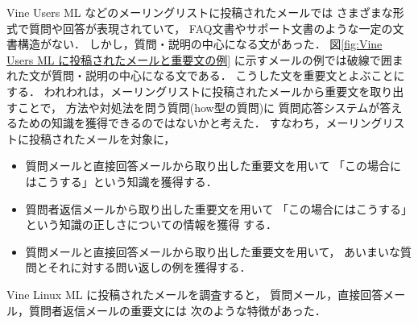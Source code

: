   Vine Users ML などのメーリングリストに投稿されたメールでは
  さまざまな形式で質問や回答が表現されていて，
  FAQ文書やサポート文書のような一定の文書構造がない．
  しかし，質問・説明の中心になる文があった．
  図\ref{fig:Vine Users ML に投稿されたメールと重要文の例}    
  に示すメールの例では破線で囲まれた文が質問・説明の中心になる文である．
  こうした文を重要文とよぶことにする．
  われわれは，メーリングリストに投稿されたメールから重要文を取り出すことで，
  方法や対処法を問う質問(how型の質問)に
  質問応答システムが答えるための知識を獲得できるのではないかと考えた．
  すなわち，メーリングリストに投稿されたメールを対象に，
  \begin{itemize}
   \item 質問メールと直接回答メールから取り出した重要文を用いて
	 「この場合にはこうする」という知識を獲得する．
   \item 質問者返信メールから取り出した重要文を用いて
	 「この場合にはこうする」という知識の正しさについての情報を獲得
	 する．
   \item 質問メールと直接回答メールから取り出した重要文を用いて，
	 あいまいな質問とそれに対する問い返しの例を獲得する．
  \end{itemize}
  Vine Linux ML に投稿されたメールを調査すると，
  質問メール，直接回答メール，質問者返信メールの重要文には
  次のような特徴があった．
